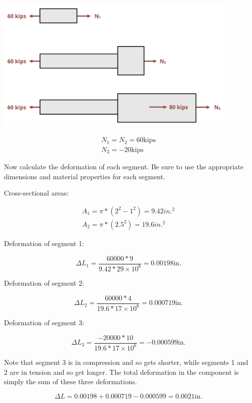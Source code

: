\documentclass[
  letterpaper,
  DIV=11,
  numbers=noendperiod]{scrreprt}
\begin{document}
\begin{tcolorbox}
\begin{tcolorbox}
\begin{center}
\includegraphics[width=4.625in,height=\textheight]{images/PNGs/Example 5.3 part 2.png}
\end{center}

\[
\begin{gathered}
N_1=N_2=60 \mathrm{kips} \\
N_3=-20 \mathrm{kips}
\end{gathered}
\]

Now calculate the deformation of each segment. Be sure to use the
appropriate dimensions and material properties for each segment.

Cross-sectional areas:

\[
\begin{gathered}
A_1=\pi *\left(2^2-1^2\right)=9.42 i n .{ }^2 \\
A_2=\pi *\left(2.5^2\right)=19.6 i n .{ }^2
\end{gathered}
\]

Deformation of segment 1:

\[
\Delta L_1=\frac{60000 * 9}{9.42 * 29 \times 10^6}=0.00198 \mathrm{in.}
\]

Deformation of segment 2:

\[
\Delta L_2=\frac{60000 * 4}{19.6 * 17 \times 10^6}=0.000719 \mathrm{in} .
\]

Deformation of segment 3:

\[
\Delta L_3=\frac{-20000 * 10}{19.6 * 17 \times 10^6}=-0.000599 \mathrm{in.}
\]

Note that segment 3 is in compression and so gets shorter, while
segments 1 and 2 are in tension and so get longer. The total deformation
in the component is simply the sum of these three deformations.

\[
\Delta L=0.00198+0.000719-0.000599=0.0021 \mathrm{in} .
\]

\end{tcolorbox}

\end{tcolorbox}
\end{document}
